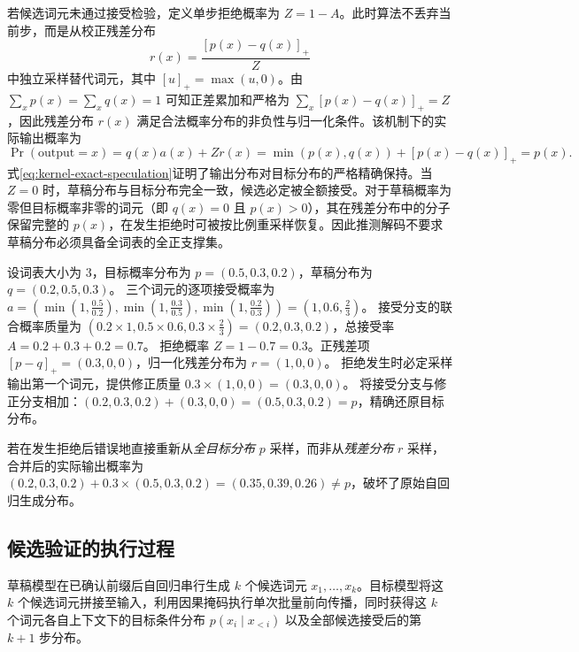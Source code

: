 \documentclass[../textbook.tex]{subfiles}
\begin{document}
若候选词元未通过接受检验，定义单步拒绝概率为 $Z=1-A$。此时算法不丢弃当前步，而是从校正残差分布
\begin{equation}
 r(x)=\frac{[p(x)-q(x)]_+}{Z}
 \label{eq:kernel-residual}
\end{equation}
中独立采样替代词元，其中 $[u]_+=\max(u,0)$。由 $\sum_x p(x)=\sum_x q(x)=1$ 可知正差累加和严格为 $\sum_x [p(x)-q(x)]_+=Z$，因此残差分布 $r(x)$ 满足合法概率分布的非负性与归一化条件。该机制下的实际输出概率为
\begin{equation}
 \Pr(\mathrm{output}=x)=q(x)a(x)+Z r(x)=\min(p(x),q(x))+[p(x)-q(x)]_+=p(x).
 \label{eq:kernel-exact-speculation}
\end{equation}
式\eqref{eq:kernel-exact-speculation}证明了输出分布对目标分布的严格精确保持。当 $Z=0$ 时，草稿分布与目标分布完全一致，候选必定被全额接受。对于草稿概率为零但目标概率非零的词元（即 $q(x)=0$ 且 $p(x)>0$），其在残差分布中的分子保留完整的 $p(x)$，在发生拒绝时可被按比例重采样恢复。因此推测解码不要求草稿分布必须具备全词表的全正支撑集。

\begin{example}
设词表大小为 $3$，目标概率分布为 $p=(0.5,0.3,0.2)$，草稿分布为 $q=(0.2,0.5,0.3)$。
三个词元的逐项接受概率为 $a=(\min(1,\frac{0.5}{0.2}),\min(1,\frac{0.3}{0.5}),\min(1,\frac{0.2}{0.3}))=(1,0.6,\frac{2}{3})$。
接受分支的联合概率质量为 $(0.2\times 1,0.5\times 0.6,0.3\times \frac{2}{3})=(0.2,0.3,0.2)$，总接受率 $A=0.2+0.3+0.2=0.7$。
拒绝概率 $Z=1-0.7=0.3$。正残差项 $[p-q]_+=(0.3,0,0)$，归一化残差分布为 $r=(1,0,0)$。
拒绝发生时必定采样输出第一个词元，提供修正质量 $0.3\times (1,0,0)=(0.3,0,0)$。
将接受分支与修正分支相加：$(0.2,0.3,0.2)+(0.3,0,0)=(0.5,0.3,0.2)=p$，精确还原目标分布。

若在发生拒绝后错误地直接重新从\emph{全目标分布} $p$ 采样，而非从\emph{残差分布} $r$ 采样，合并后的实际输出概率为 $(0.2,0.3,0.2)+0.3\times(0.5,0.3,0.2)=(0.35,0.39,0.26)\ne p$，破坏了原始自回归生成分布。
\end{example}

\subsection{候选验证的执行过程}

草稿模型在已确认前缀后自回归串行生成 $k$ 个候选词元 $x_1,\ldots,x_k$。目标模型将这 $k$ 个候选词元拼接至输入，利用因果掩码执行单次批量前向传播，同时获得这 $k$ 个词元各自上下文下的目标条件分布 $p(x_i\mid x_{<i})$ 以及全部候选接受后的第 $k+1$ 步分布。
\end{document}
